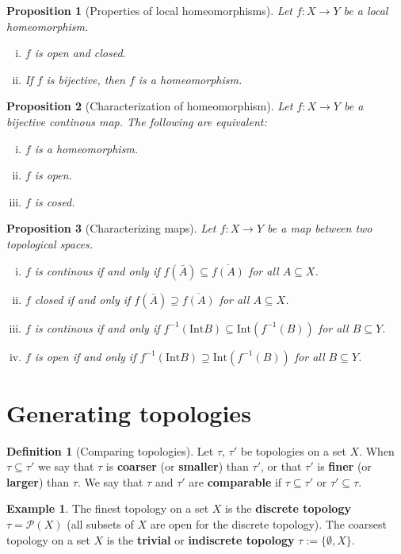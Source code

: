 \documentclass[a4paper,12pt,parskip=half*,chapterprefix=true,numbers=noendperiod]{scrreprt}
\newtheorem{proposition}{Proposition}[section]
\theoremstyle{definition}
\newtheorem{definition}{Definition}[section]
\newtheorem{example}{Example}[section]
\theoremstyle{remark}
\begin{document}
\begin{proposition}[Properties of local homeomorphisms]
	Let $f:X\to Y$ be a local homeomorphism.
	\begin{enumerate}[(i)]
		\item $f$ is open and closed.
		\item If $f$ is bijective, then $f$ is a homeomorphism.
	\end{enumerate}
\end{proposition}

\begin{proposition}[Characterization of homeomorphism]
	Let $f:X\to Y$ be a bijective continous map. The following are equivalent:
	\begin{enumerate}[(i)]
		\item $f$ is a homeomorphism.
		\item $f$ is open.
		\item $f$ is cosed.
	\end{enumerate}
\end{proposition}

\begin{proposition}[Characterizing maps]
	Let $f:X\to Y$ be a map between two topological spaces.
	\begin{enumerate}[(i)]
		\item $f$ is continous if and only if $f(\bar{A})\subseteq \overline{f(A)}$ for all $A\subseteq X$.
		\item $f$ closed if and only if $f(\bar{A})\supseteq \overline{f(A)}$ for all $A\subseteq X$.
		\item $f$ is continous if and only if $f^{-1}(\text{Int}B)\subseteq \text{Int}(f^{-1}(B))$ for all $B\subseteq Y$.
		\item $f$ is open if and only if $f^{-1}(\text{Int}B)\supseteq \text{Int}(f^{-1}(B))$ for all $B\subseteq Y$.
	\end{enumerate}
\end{proposition}

\section{Generating topologies}


\begin{definition}[Comparing topologies]
	Let $\tau$, $\tau'$ be topologies on a set $X$. When $\tau\subseteq \tau'$ we say that $\tau$ is \textbf{coarser} (or \textbf{smaller}) than $\tau'$, or that $\tau'$ is \textbf{finer} (or \textbf{larger}) than $\tau$. We say that $\tau$ and $\tau'$ are \textbf{comparable} if $\tau\subseteq\tau'$ or $\tau'\subseteq\tau$.
\end{definition}
\begin{example}
	The finest topology on a set $X$ is the \textbf{discrete topology} $\tau=\mathcal{P}(X)$ (all subsets of $X$ are open for the discrete topology). The coarsest topology on a set $X$ is the \textbf{trivial} or \textbf{indiscrete topology} $\tau:=\{\emptyset,X\}$.
\end{example}
\end{document}
